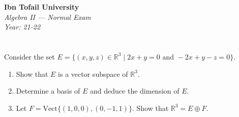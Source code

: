 \documentclass[12pt]{article}
\begin{document}
\begin{center}
  \Large\textbf{Ibn Tofail University} \\[1em]
  \large\textit{Algebra II — Normal Exam} \\[0.5em]
  \large\textit{Year: 21-22} \\[2em]
\end{center}

\vspace{0.5cm}

\section{}
Consider the set $E = \{(x,y,z) \in \mathbb{R}^3 \mid 2x + y = 0 \text{ and } -2x + y - z = 0\}$.

\begin{enumerate}
    \item Show that $E$ is a vector subspace of $\mathbb{R}^3$.
    \item Determine a basis of $E$ and deduce the dimension of $E$.
    \item Let $F = \text{Vect}\{(1,0,0), (0,-1,1)\}$. Show that $\mathbb{R}^3 = E \oplus F$.
\end{enumerate}

\newpage
\end{document}

